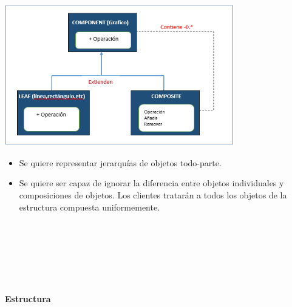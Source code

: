 \begin{flushleft}

\begin{center}
	\includegraphics[width=10cm]{./Imagenes/composite1} 
	\end{center}
\begin{itemize}
\textbf{Uso}

El patrón Composite sirve para construir objetos complejos a partir de otros más simples y similares entre sí, gracias a la composición recursiva y a una estructura en forma de árbol.  Esto simplifica el tratamiento de los objetos creados, ya que al poseer todos ellos una interfaz común, se tratan todos de la misma manera. Dependiendo de la implementación, pueden aplicarse procedimientos al total o una de las partes de la estructura compuesta (todo o parte) como si de un nodo final se tratara, aunque dicha parte esté compuesta a su vez de muchas otras.

\textbf{}\\
\textbf{Aplicación}


Usar el patrón COMPOSITE cuando:


  \item Se quiere representar jerarquías de objetos todo-parte.
  \item Se quiere ser capaz de ignorar la diferencia entre objetos individuales y composiciones de objetos.  Los clientes tratarán a todos los objetos de la estructura compuesta uniformemente.

\end{itemize} 

\textbf{}\\
\textbf{}\\
\textbf{}\\
\textbf{}\\
\textbf{}\\
\textbf{}\\
\textbf{Estructura}


\end{flushleft}
